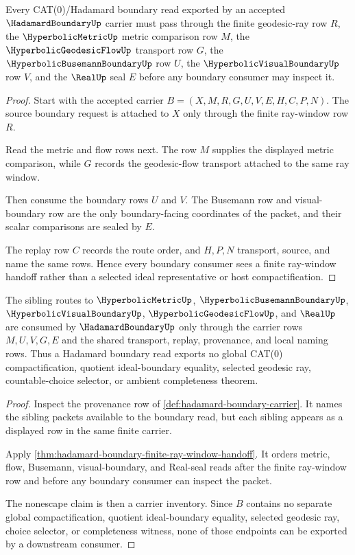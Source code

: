 \begin{theorem}
\label{thm:hadamard-boundary-finite-ray-window-handoff}
Every CAT(0)/Hadamard boundary read exported by an accepted $\HadamardBoundaryUp$ carrier must pass through the finite geodesic-ray row $R$, the $\HyperbolicMetricUp$ metric comparison row $M$, the $\HyperbolicGeodesicFlowUp$ transport row $G$, the $\HyperbolicBusemannBoundaryUp$ row $U$, the $\HyperbolicVisualBoundaryUp$ row $V$, and the $\RealUp$ seal $E$ before any boundary consumer may inspect it.
\end{theorem}
\begin{proof}
Start with the accepted carrier $B=(X,M,R,G,U,V,E,H,C,P,N)$. The source boundary request is attached to $X$ only through the finite ray-window row $R$.

Read the metric and flow rows next. The row $M$ supplies the displayed metric comparison, while $G$ records the geodesic-flow transport attached to the same ray window.

Then consume the boundary rows $U$ and $V$. The Busemann row and visual-boundary row are the only boundary-facing coordinates of the packet, and their scalar comparisons are sealed by $E$.

The replay row $C$ records the route order, and $H,P,N$ transport, source, and name the same rows. Hence every boundary consumer sees a finite ray-window handoff rather than a selected ideal representative or host compactification.
\end{proof}

\begin{theorem}
\label{thm:hadamard-boundary-sibling-nonescape}
The sibling routes to $\HyperbolicMetricUp$, $\HyperbolicBusemannBoundaryUp$, $\HyperbolicVisualBoundaryUp$, $\HyperbolicGeodesicFlowUp$, and $\RealUp$ are consumed by $\HadamardBoundaryUp$ only through the carrier rows $M,U,V,G,E$ and the shared transport, replay, provenance, and local naming rows. Thus a Hadamard boundary read exports no global CAT(0) compactification, quotient ideal-boundary equality, selected geodesic ray, countable-choice selector, or ambient completeness theorem.
\end{theorem}
\begin{proof}
Inspect the provenance row of \autoref{def:hadamard-boundary-carrier}. It names the sibling packets available to the boundary read, but each sibling appears as a displayed row in the same finite carrier.

Apply \autoref{thm:hadamard-boundary-finite-ray-window-handoff}. It orders metric, flow, Busemann, visual-boundary, and Real-seal reads after the finite ray-window row and before any boundary consumer can inspect the packet.

The nonescape claim is then a carrier inventory. Since $B$ contains no separate global compactification, quotient ideal-boundary equality, selected geodesic ray, choice selector, or completeness witness, none of those endpoints can be exported by a downstream consumer.
\end{proof}

